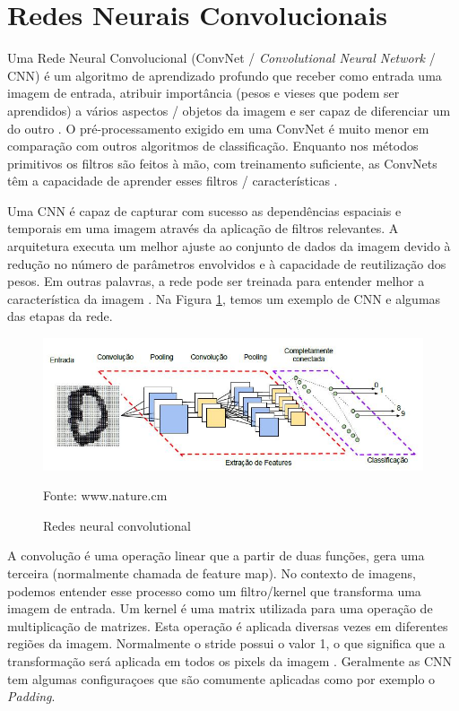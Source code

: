 \documentclass[openright]{UFRGS} %
\begin{document}
\section{Redes Neurais Convolucionais}

Uma Rede Neural Convolucional (ConvNet / \textit{Convolutional Neural Network} / CNN) é um algoritmo de aprendizado profundo que receber como entrada uma imagem de entrada, atribuir importância (pesos e vieses que podem ser aprendidos) a vários aspectos / objetos da imagem e ser capaz de diferenciar um do outro  \cite{vargas2016estudo}. O pré-processamento exigido em uma ConvNet é muito menor em comparação com outros algoritmos de classificação. Enquanto nos métodos primitivos os filtros são feitos à mão, com treinamento suficiente, as ConvNets têm a capacidade de aprender esses filtros / características \cite{vargas2016estudo}.

Uma CNN é capaz de capturar com sucesso as dependências espaciais e temporais em uma imagem através da aplicação de filtros relevantes. A arquitetura executa um melhor ajuste ao conjunto de dados da imagem devido à redução no número de parâmetros envolvidos e à capacidade de reutilização dos pesos. Em outras palavras, a rede pode ser treinada para entender melhor a característica da imagem \cite{shalev2014understanding}. Na Figura \ref{fig:cnnref}, temos um exemplo de CNN e algumas das etapas da rede.



\begin{figure}[h]
    \centering
    \caption{Redes neural convolutional}
    \includegraphics[scale=0.50]{cnn.jpg}
    \centerline{Fonte: www.nature.cm}
    \label{fig:cnnref}
\end{figure}

A convolução é uma operação linear que a partir de duas funções, gera uma terceira (normalmente chamada de feature map). No contexto de imagens, podemos entender esse processo como um filtro/kernel que transforma uma imagem de entrada.
Um kernel é uma matrix utilizada para uma operação de multiplicação de matrizes. Esta operação é aplicada diversas vezes em diferentes regiões da imagem. Normalmente o stride possui o valor 1, o que significa que a transformação será aplicada em todos os pixels da imagem \cite{shalev2014understanding}. Geralmente as CNN tem algumas configuraçoes que são comumente aplicadas como por exemplo o \textit{Padding}.
\end{document}
